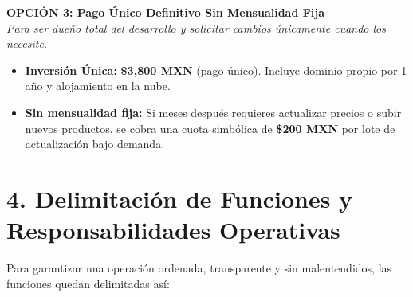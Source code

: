 \documentclass[10pt,letterpaper]{article}
\begin{document}
\newpage

\begin{tcolorbox}[colback=white, colframe=SlateNavy, boxrule=1pt]
    {\color{SlateNavy}\textbf{\normalsize OPCIÓN 3: Pago Único Definitivo Sin Mensualidad Fija}} \\
    \textit{Para ser dueño total del desarrollo y solicitar cambios únicamente cuando los necesite.}
    \begin{itemize}[leftmargin=*,itemsep=1.5pt]
        \item \textbf{Inversión Única:} \textbf{\$3,800 MXN} (pago único). Incluye dominio propio por 1 año y alojamiento en la nube.
        \item \textbf{Sin mensualidad fija:} Si meses después requieres actualizar precios o subir nuevos productos, se cobra una cuota simbólica de \textbf{\$200 MXN} por lote de actualización bajo demanda.
    \end{itemize}
\end{tcolorbox}

\vspace{0.1cm}

\section*{4. Delimitación de Funciones y Responsabilidades Operativas}
Para garantizar una operación ordenada, transparente y sin malentendidos, las funciones quedan delimitadas así:
\end{document}
